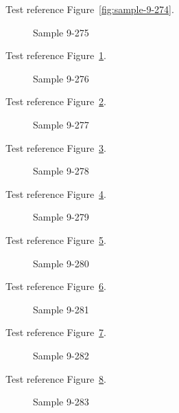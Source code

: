 Test reference Figure~\ref{fig:sample-9-274}.

\begin{figure}[tbhp]
\caption{Sample 9-275}
\label{fig:sample-9-275}
\end{figure}

Test reference Figure~\ref{fig:sample-9-275}.

\begin{figure}[tbhp]
\caption{Sample 9-276}
\label{fig:sample-9-276}
\end{figure}

Test reference Figure~\ref{fig:sample-9-276}.

\begin{figure}[tbhp]
\caption{Sample 9-277}
\label{fig:sample-9-277}
\end{figure}

Test reference Figure~\ref{fig:sample-9-277}.

\begin{figure}[tbhp]
\caption{Sample 9-278}
\label{fig:sample-9-278}
\end{figure}

Test reference Figure~\ref{fig:sample-9-278}.

\begin{figure}[tbhp]
\caption{Sample 9-279}
\label{fig:sample-9-279}
\end{figure}

Test reference Figure~\ref{fig:sample-9-279}.

\begin{figure}[tbhp]
\caption{Sample 9-280}
\label{fig:sample-9-280}
\end{figure}

Test reference Figure~\ref{fig:sample-9-280}.

\begin{figure}[tbhp]
\caption{Sample 9-281}
\label{fig:sample-9-281}
\end{figure}

Test reference Figure~\ref{fig:sample-9-281}.

\begin{figure}[tbhp]
\caption{Sample 9-282}
\label{fig:sample-9-282}
\end{figure}

Test reference Figure~\ref{fig:sample-9-282}.

\begin{figure}[tbhp]
\caption{Sample 9-283}
\label{fig:sample-9-283}
\end{figure}

